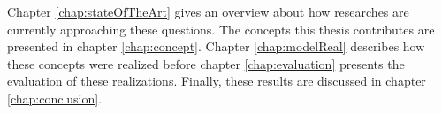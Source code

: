 Chapter \ref{chap:stateOfTheArt} gives an overview about how researches are 
currently approaching these questions. The concepts this thesis contributes 
are presented in chapter \ref{chap:concept}. Chapter \ref{chap:modelReal} 
describes how these concepts were realized before chapter \ref{chap:evaluation} 
presents the evaluation of these realizations. Finally, these results are discussed in chapter 
\ref{chap:conclusion}.

